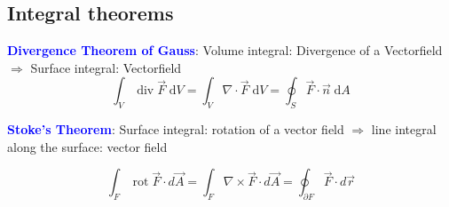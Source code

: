 	\subsection{Integral theorems}
	
		
		\textcolor{blue}{\textbf{Divergence Theorem of Gauss}}: Volume integral: Divergence of a Vectorfield $\Rightarrow$ Surface integral: Vectorfield\\
		
		$$\int_V \operatorname{div} \vec{F} \; \mathrm dV = 
				\int_V \nabla\cdot \vec{F} \; \mathrm dV =
				\oint_{S} \vec F \cdot\vec n\; \mathrm dA
		$$

	\textcolor{blue}{\textbf{Stoke's Theorem}}: Surface integral: rotation of a vector field $\Rightarrow$ line integral along the surface: vector field  
	
	$$\int_{F} \operatorname{rot} \vec F \cdot d \vec A =
		\int_{F} \nabla \times \vec F \cdot d \vec A =
		\oint_{\partial F} \vec F \cdot d \vec r $$
	


	
